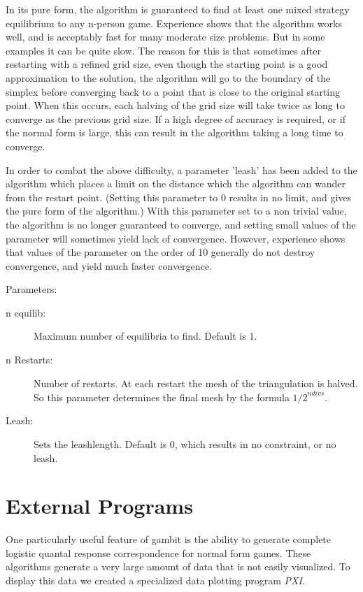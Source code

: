 {In its pure form, the algorithm is guaranteed to find at least one
mixed strategy equilibrium to any n-person game.  Experience shows
that the algorithm works well, and is acceptably fast for many
moderate size problems.  But in some examples it can be quite slow.
The reason for this is that sometimes after restarting with a refined
grid size, even though the starting point is a good approximation to
the solution, the algorithm will go to the boundary of the simplex
before converging back to a point that is close to the original
starting point.  When this occurs, each halving of the grid size will
take twice as long to converge as the previous grid size.  If a high
degree of accuracy is required, or if the normal form is large, this
can result in the algorithm taking a long time to converge.

In order to combat the above difficulty, a parameter 'leash' has been
added to the algorithm which places a limit on the distance which the
algorithm can wander from the restart point. (Setting this parameter
to 0 results in no limit, and gives the pure form of the algorithm.)
With this parameter set to a non trivial value, the algorithm is no
longer guaranteed to converge, and setting small values of the
parameter will sometimes yield lack of convergence.  However,
experience shows that values of the parameter on the order of 10
generally do not destroy convergence, and yield much faster
convergence.

Parameters:

\begin{description}
\item[n equilib:] Maximum number of equilibria to find. Default is 1.  
\item[n Restarts:] Number of restarts.  At each restart the mesh of the
triangulation is halved.  So this parameter determines the final mesh
by the formula ${1/2}^{ndivs}$.
\item[Leash:] Sets the leashlength. Default is 0, which results in no
constraint, or no leash.  
\end{description}

\chapter{External Programs}
One particularly useful feature of gambit is the ability to generate complete 
logistic quantal response correspondence for normal form games.  These
algorithms generate a very large amount of data that is not easily visualized.
To display this data we created a specialized data plotting program {\em PXI}.


}
